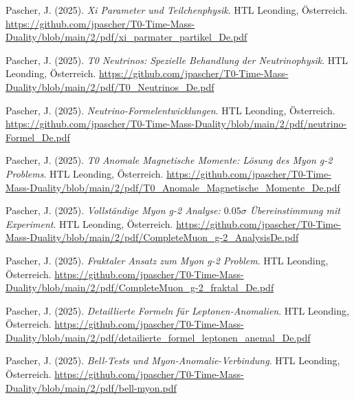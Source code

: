 \documentclass{article}
\begin{document}
\begin{thebibliography}{99}
		Pascher, J. (2025).
		\textit{Xi Parameter und Teilchenphysik}.
		HTL Leonding, Österreich.
		\url{https://github.com/jpascher/T0-Time-Mass-Duality/blob/main/2/pdf/xi_parmater_partikel_De.pdf}
		
		
		Pascher, J. (2025).
		\textit{T0 Neutrinos: Spezielle Behandlung der Neutrinophysik}.
		HTL Leonding, Österreich.
		\url{https://github.com/jpascher/T0-Time-Mass-Duality/blob/main/2/pdf/T0_Neutrinos_De.pdf}
		
		Pascher, J. (2025).
		\textit{Neutrino-Formelentwicklungen}.
		HTL Leonding, Österreich.
		\url{https://github.com/jpascher/T0-Time-Mass-Duality/blob/main/2/pdf/neutrino-Formel_De.pdf}
		
		
		Pascher, J. (2025).
		\textit{T0 Anomale Magnetische Momente: Lösung des Myon g-2 Problems}.
		HTL Leonding, Österreich.
		\url{https://github.com/jpascher/T0-Time-Mass-Duality/blob/main/2/pdf/T0_Anomale_Magnetische_Momente_De.pdf}
		
		Pascher, J. (2025).
		\textit{Vollständige Myon g-2 Analyse: $0.05\sigma$ Übereinstimmung mit Experiment}.
		HTL Leonding, Österreich.
		\url{https://github.com/jpascher/T0-Time-Mass-Duality/blob/main/2/pdf/CompleteMuon_g-2_AnalysisDe.pdf}
		
		Pascher, J. (2025).
		\textit{Fraktaler Ansatz zum Myon g-2 Problem}.
		HTL Leonding, Österreich.
		\url{https://github.com/jpascher/T0-Time-Mass-Duality/blob/main/2/pdf/CompleteMuon_g-2_fraktal_De.pdf}
		
		Pascher, J. (2025).
		\textit{Detaillierte Formeln für Leptonen-Anomalien}.
		HTL Leonding, Österreich.
		\url{https://github.com/jpascher/T0-Time-Mass-Duality/blob/main/2/pdf/detailierte_formel_leptonen_anemal_De.pdf}
		
		Pascher, J. (2025).
		\textit{Bell-Tests und Myon-Anomalie-Verbindung}.
		HTL Leonding, Österreich.
		\url{https://github.com/jpascher/T0-Time-Mass-Duality/blob/main/2/pdf/bell-myon.pdf}
		
		

\end{thebibliography}
\end{document}
